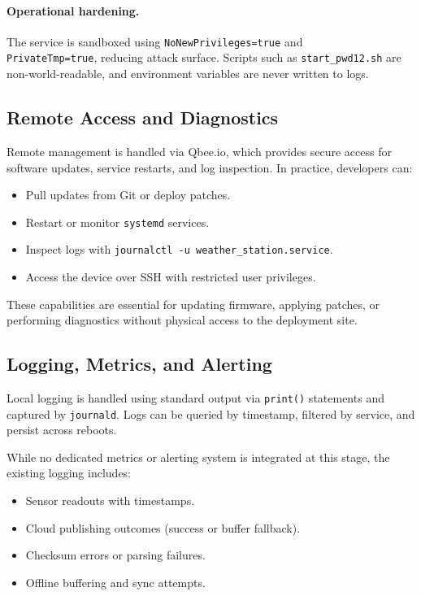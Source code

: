 \paragraph{Operational hardening.}
The service is sandboxed using \texttt{NoNewPrivileges=true} and\\  \texttt{PrivateTmp=true}, reducing attack surface. Scripts such as \texttt{start\_pwd12.sh} are non-world-readable, and environment variables are never written to logs.



\subsection{Remote Access and Diagnostics}

Remote management is handled via Qbee.io, which provides secure access for software updates, service restarts, and log inspection. In practice, developers can:
\begin{itemize}
    \item Pull updates from Git or deploy patches.
    \item Restart or monitor \texttt{systemd} services.
    \item Inspect logs with \texttt{journalctl -u weather\_station.service}.
    \item Access the device over SSH with restricted user privileges.
\end{itemize}

These capabilities are essential for updating firmware, applying patches, or performing diagnostics without physical access to the deployment site.


\subsection{Logging, Metrics, and Alerting}

Local logging is handled using standard output via \texttt{print()} statements and captured by \texttt{journald}. Logs can be queried by timestamp, filtered by service, and persist across reboots.

While no dedicated metrics or alerting system is integrated at this stage, the existing logging includes:
\begin{itemize}
    \item Sensor readouts with timestamps.
    \item Cloud publishing outcomes (success or buffer fallback).
    \item Checksum errors or parsing failures.
    \item Offline buffering and sync attempts.
\end{itemize}

